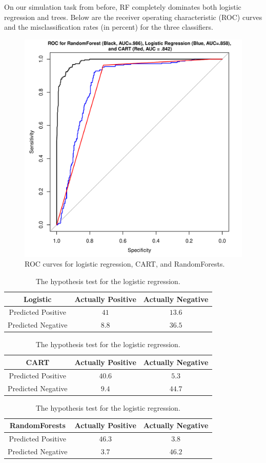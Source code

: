 \documentclass[11pt]{article}
\begin{document}
On our simulation task from before, RF completely dominates both logistic regression and trees. Below are the receiver operating characteristic (ROC) curves and the misclassification rates (in percent) for the three classifiers.

\begin{figure}[H] \center
\includegraphics[scale=.5]{../Figures/ROC_LogitRF.pdf} 
\caption{ROC curves for logistic regression, CART, and RandomForests.}
\end{figure}

\begin{table}[H] \center
\caption{The hypothesis test for the logistic regression.}
\begin{tabular}{|c|c|c|} \hline
\textbf{Logistic} & Actually Positive & Actually Negative \\ \hline
Predicted Positive & $41$ & $13.6$ \\ \hline
Predicted Negative & $8.8$ & $36.5$ \\ \hline
\end{tabular}

\begin{tabular}{|c|c|c|} \hline
\textbf{CART} & Actually Positive & Actually Negative \\ \hline
Predicted Positive & $40.6$ & $5.3$ \\ \hline
Predicted Negative & $9.4$ & $44.7$ \\ \hline
\end{tabular}

\begin{tabular}{|c|c|c|} \hline
\textbf{RandomForests} & Actually Positive & Actually Negative \\ \hline
Predicted Positive & $46.3$ & $3.8$ \\ \hline
Predicted Negative & $3.7$ & $46.2$ \\ \hline
\end{tabular}
\end{table}
\end{document}
